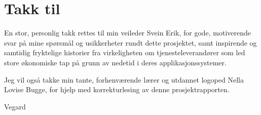\section*{Takk til}

En stor, personlig takk rettes til min veileder Svein Erik, for gode, motiverende svar på mine spørsmål og usikkerheter rundt dette prosjektet, samt inspirende og samtidig fryktelige historier fra virkeligheten om tjenesteleverandører som led store økonomiske tap på grunn av nedetid i deres applikasjonssystemer.

Jeg vil også takke min tante, forhenværende lærer og utdannet logoped Nella Lovise Bugge, for hjelp med korrekturlesing av denne prosjektrapporten.

\begin{flushright}
Vegard
\end{flushright}

\newpage
